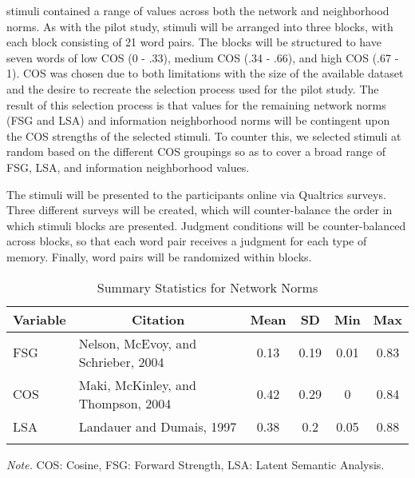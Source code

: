 \documentclass[english,man]{apa6}
\theoremstyle{definition}
\theoremstyle{definition}
\theoremstyle{definition}
\theoremstyle{remark}
\begin{document}
stimuli contained a range of values across both the network and
neighborhood norms. As with the pilot study, stimuli will be arranged
into three blocks, with each block consisting of 21 word pairs. The
blocks will be structured to have seven words of low COS (0 - .33),
medium COS (.34 - .66), and high COS (.67 - 1). COS was chosen due to
both limitations with the size of the available dataset and the desire
to recreate the selection process used for the pilot study. The result
of this selection process is that values for the remaining network norms
(FSG and LSA) and information neighborhood norms will be contingent upon
the COS strengths of the selected stimuli. To counter this, we selected
stimuli at random based on the different COS groupings so as to cover a
broad range of FSG, LSA, and information neighborhood values.

The stimuli will be presented to the participants online via Qualtrics
surveys. Three different surveys will be created, which will
counter-balance the order in which stimuli blocks are presented.
Judgment conditions will be counter-balanced across blocks, so that each
word pair receives a judgment for each type of memory. Finally, word
pairs will be randomized within blocks.

\begin{table}[tbp]
\begin{center}
\begin{threeparttable}
\caption{\label{tab:stim-table}Summary Statistics for Network Norms}
\begin{tabular}{llcccc}
\toprule
Variable & \multicolumn{1}{c}{Citation} & \multicolumn{1}{c}{Mean} & \multicolumn{1}{c}{SD} & \multicolumn{1}{c}{Min} & \multicolumn{1}{c}{Max}\\
\midrule
FSG & Nelson, McEvoy, and Schrieber, 2004 & 0.13 & 0.19 & 0.01 & 0.83\\
COS & Maki, McKinley, and Thompson, 2004 & 0.42 & 0.29 & 0 & 0.84\\
LSA & Landauer and Dumais, 1997 & 0.38 & 0.2 & 0.05 & 0.88\\
\bottomrule
\addlinespace
\end{tabular}
\begin{tablenotes}[para]
\textit{Note.} COS: Cosine, FSG: Forward Strength, LSA: Latent Semantic Analysis.
\end{tablenotes}
\end{threeparttable}
\end{center}
\end{table}
\end{document}
